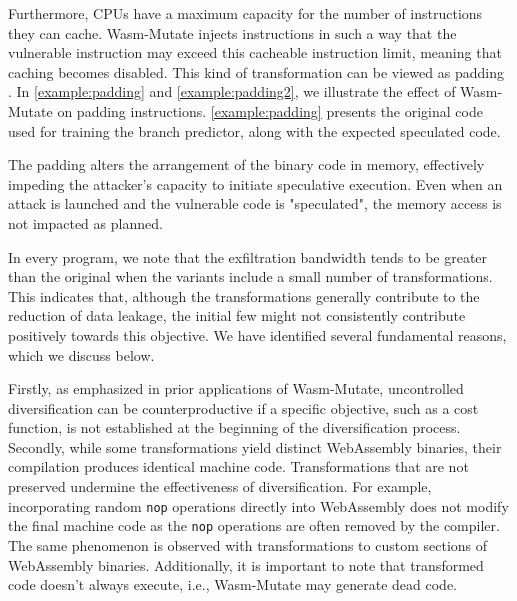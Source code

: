 \documentclass[a4paper,fleqn]{cas-dc}
\newcommand{\tool}{{\sc Wasm-Mutate}\xspace}
\newcommand{\Wasm}{WebAssembly\xspace}
\newcommand{\wasm}{\Wasm}
\begin{document}
Furthermore, CPUs have a maximum capacity for the number of instructions they can cache.
\tool injects instructions in such a way that the vulnerable instruction may exceed this cacheable instruction limit, meaning that caching becomes disabled.
This kind of transformation can be viewed as padding \cite{padding}.
In \autoref{example:padding} and \autoref{example:padding2}, we illustrate the effect of \tool on padding instructions.
\autoref{example:padding} presents the original code used for training the branch predictor, along with the expected speculated code.



The padding alters the arrangement of the binary code in memory, effectively impeding the attacker's capacity to initiate speculative execution.
Even when an attack is launched and the vulnerable code is "speculated", the memory access is not impacted as planned.


In every program, we note that the exfiltration bandwidth tends to be greater than the original when the variants include a small number of transformations.
This indicates that, although the transformations generally contribute to the reduction of data leakage, the initial few might not consistently contribute positively towards this objective.
We have identified several fundamental reasons, which we discuss below.

Firstly, as emphasized in prior applications of \tool \cite{CABRERAARTEAGA2023103296}, uncontrolled diversification can be counterproductive if a specific objective, such as a cost function, is not established at the beginning of the diversification process.
Secondly, while some transformations yield distinct \wasm binaries, their compilation produces identical machine code.
Transformations that are not preserved undermine the effectiveness of diversification.
For example, incorporating random \texttt{nop} operations directly into \wasm does not modify the final machine code as the \texttt{nop} operations are often removed by the compiler.
The same phenomenon is observed with transformations to custom sections of \Wasm binaries.
Additionally, it is important to note that transformed code doesn't always execute, i.e., \tool may generate dead code.
\end{document}
